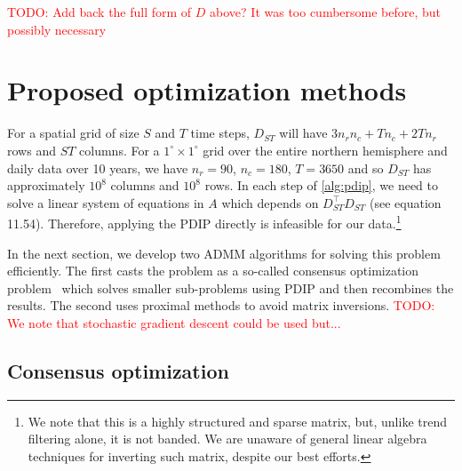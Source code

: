 \documentclass{article}
\newcommand{\attn}[1]{\textcolor{red}{TODO: #1}}
\begin{document}
\attn{Add back the full form of $D$ above? It was too cumbersome
  before, but possibly necessary}

\section{Proposed optimization methods}
\label{sec:prop-optim-meth}

For a spatial grid of size $S$ and $T$ time steps, $D_{ST}$ will have
$3n_rn_c+Tn_c+2Tn_r$ rows and $ST$ columns. For a $1^\circ\times
1^\circ$ grid over the
entire northern hemisphere and daily data over 10 years, we have
$n_r=90$, $n_c=180$, $T=3650$ and so $D_{ST}$ has approximately
$10^8$ columns and $10^8$
rows. In each
step of \autoref{alg:pdip}, we need to solve a linear system of
equations in $A$ which depends on $D_{ST}^\top D_{ST}$ (see \citep{boyd_convex_2004}
equation 11.54). Therefore, 
applying the PDIP directly is infeasible for our data.\footnote{We note that this
  is a highly structured and sparse matrix, but, unlike trend
  filtering alone, it is not banded. We are unaware of general
  linear algebra techniques for inverting such matrix, despite our
  best efforts.} 

In the next section, we develop two ADMM algorithms for solving this
problem efficiently. The first casts the problem as a
so-called consensus optimization problem~\citep{boyd_distributed_2011}
which solves smaller sub-problems using PDIP and then recombines the results. The
second uses proximal methods to avoid matrix inversions. 
\attn{We note that stochastic gradient descent could be used but...}

\subsection{Consensus optimization}
\label{sec:consOpt}
\end{document}
